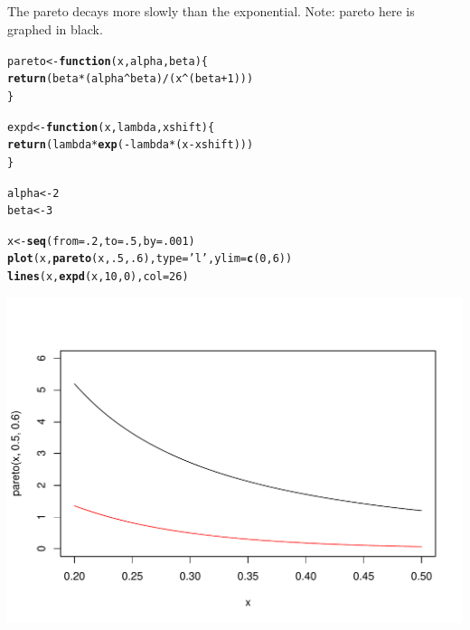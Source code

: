 \documentclass{article}\usepackage[]{graphicx}\usepackage[]{color}
\makeatletter
\def\maxwidth{ %
  \ifdim\Gin@nat@width>\linewidth
    \linewidth
  \else
    \Gin@nat@width
  \fi
}
\newcommand{\hlnum}[1]{\textcolor[rgb]{0.686,0.059,0.569}{#1}}%
\newcommand{\hlstr}[1]{\textcolor[rgb]{0.192,0.494,0.8}{#1}}%
\newcommand{\hlopt}[1]{\textcolor[rgb]{0,0,0}{#1}}%
\newcommand{\hlstd}[1]{\textcolor[rgb]{0.345,0.345,0.345}{#1}}%
\newcommand{\hlkwa}[1]{\textcolor[rgb]{0.161,0.373,0.58}{\textbf{#1}}}%
\newcommand{\hlkwb}[1]{\textcolor[rgb]{0.69,0.353,0.396}{#1}}%
\newcommand{\hlkwc}[1]{\textcolor[rgb]{0.333,0.667,0.333}{#1}}%
\newcommand{\hlkwd}[1]{\textcolor[rgb]{0.737,0.353,0.396}{\textbf{#1}}}%
\newenvironment{kframe}{%
 \def\at@end@of@kframe{}%
 \ifinner\ifhmode%
  \def\at@end@of@kframe{\end{minipage}}%
  \begin{minipage}{\columnwidth}%
 \fi\fi%
 \def\FrameCommand##1{\hskip\@totalleftmargin \hskip-\fboxsep
 \colorbox{shadecolor}{##1}\hskip-\fboxsep
     \hskip-\linewidth \hskip-\@totalleftmargin \hskip\columnwidth}%
 \MakeFramed {\advance\hsize-\width
   \@totalleftmargin\z@ \linewidth\hsize
   \@setminipage}}%
 {\par\unskip\endMakeFramed%
 \at@end@of@kframe}
\newenvironment{knitrout}{}{} %
\makeatother
\begin{document}
\subsection{}

The pareto decays more slowly than the exponential.  Note: pareto here is graphed in black.

\begin{knitrout}
\color{fgcolor}\begin{kframe}
\begin{alltt}
\hlstd{pareto} \hlkwb{<-} \hlkwa{function}\hlstd{(}\hlkwc{x}\hlstd{,} \hlkwc{alpha}\hlstd{,} \hlkwc{beta}\hlstd{) \{}
  \hlkwd{return}\hlstd{(beta} \hlopt{*} \hlstd{(alpha}\hlopt{^}\hlstd{beta)} \hlopt{/} \hlstd{(x}\hlopt{^}\hlstd{(beta}\hlopt{+}\hlnum{1}\hlstd{)))}
\hlstd{\}}

\hlstd{expd} \hlkwb{<-} \hlkwa{function}\hlstd{(}\hlkwc{x}\hlstd{,} \hlkwc{lambda}\hlstd{,} \hlkwc{xshift}\hlstd{) \{}
  \hlkwd{return}\hlstd{( lambda} \hlopt{*} \hlkwd{exp}\hlstd{(} \hlopt{-}\hlstd{lambda} \hlopt{*} \hlstd{(x} \hlopt{-} \hlstd{xshift) ))}
\hlstd{\}}

\hlstd{alpha} \hlkwb{<-} \hlnum{2}
\hlstd{beta} \hlkwb{<-} \hlnum{3}

\hlstd{x} \hlkwb{<-} \hlkwd{seq}\hlstd{(}\hlkwc{from}\hlstd{=}\hlnum{.2}\hlstd{,} \hlkwc{to}\hlstd{=}\hlnum{.5}\hlstd{,} \hlkwc{by}\hlstd{=}\hlnum{.001}\hlstd{)}
\hlkwd{plot}\hlstd{(x,} \hlkwd{pareto}\hlstd{(x,} \hlnum{.5}\hlstd{,} \hlnum{.6}\hlstd{),} \hlkwc{type}\hlstd{=}\hlstr{'l'}\hlstd{,}\hlkwc{ylim}\hlstd{=}\hlkwd{c}\hlstd{(}\hlnum{0}\hlstd{,}\hlnum{6}\hlstd{))}
\hlkwd{lines}\hlstd{(x,} \hlkwd{expd}\hlstd{(x,} \hlnum{10}\hlstd{,} \hlnum{0}\hlstd{),} \hlkwc{col}\hlstd{=}\hlnum{26}\hlstd{)}
\end{alltt}
\end{kframe}
\includegraphics[width=\maxwidth]{figure/unnamed-chunk-1-1} 

\end{knitrout}
\end{document}
